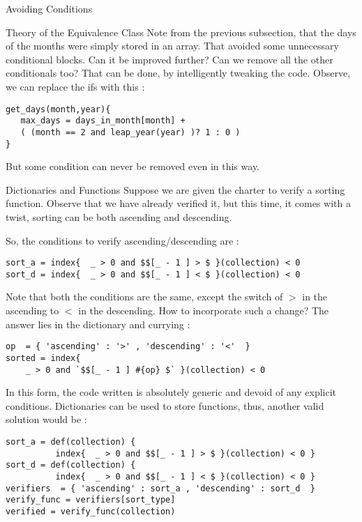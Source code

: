 \begin{section}{Avoiding Conditions}
\begin{subsection}{Theory of the Equivalence Class}
Note from the previous subsection, that the days of the months were simply stored
in an array. That avoided some unnecessary conditional blocks.
Can it be improved further? Can we remove all the other conditionals too?
That can be done, by intelligently tweaking the code.
Observe, we can replace the ifs with this :

\begin{lstlisting}[style=JexlStyle]
get_days(month,year){
   max_days = days_in_month[month] + 
   ( (month == 2 and leap_year(year) )? 1 : 0 )
}
\end{lstlisting} 
But some condition can never be removed even in this way.
\end{subsection}

\begin{subsection}{Dictionaries and Functions}
Suppose we are given the charter to verify a sorting function.
Observe that we have already verified it, but this time, 
it comes with a twist, sorting can be both ascending and descending.

So, the conditions to verify ascending/descending are :

\begin{center}\begin{minipage}{\linewidth}
\begin{lstlisting}[style=JexlStyle]
sort_a = index{  _ > 0 and $$[_ - 1 ] > $ }(collection) < 0 
sort_d = index{  _ > 0 and $$[_ - 1 ] < $ }(collection) < 0 
\end{lstlisting} 
\end{minipage}\end{center}


Note that both the conditions are the same, except the switch of $>$ in the ascending 
to  $<$ in the descending. How to incorporate such a change?
The answer lies in the dictionary and currying :

\begin{lstlisting}[style=JexlStyle]
op  = { 'ascending' : '>' , 'descending' : '<'  }
sorted = index{ 
    _ > 0 and `$$[_ - 1 ] #{op} $` }(collection) < 0 
\end{lstlisting} 

In this form, the code written is absolutely generic and devoid of any explicit conditions.
Dictionaries can be used to store functions, thus, another valid solution would be :

\begin{lstlisting}[style=JexlStyle]
sort_a = def(collection) { 
          index{  _ > 0 and $$[_ - 1 ] > $ }(collection) < 0 }
sort_d = def(collection) { 
          index{  _ > 0 and $$[_ - 1 ] < $ }(collection) < 0 }
verifiers  = { 'ascending' : sort_a , 'descending' : sort_d  }
verify_func = verifiers[sort_type] 
verified = verify_func(collection)
\end{lstlisting} 
\end{subsection}


\end{section}

